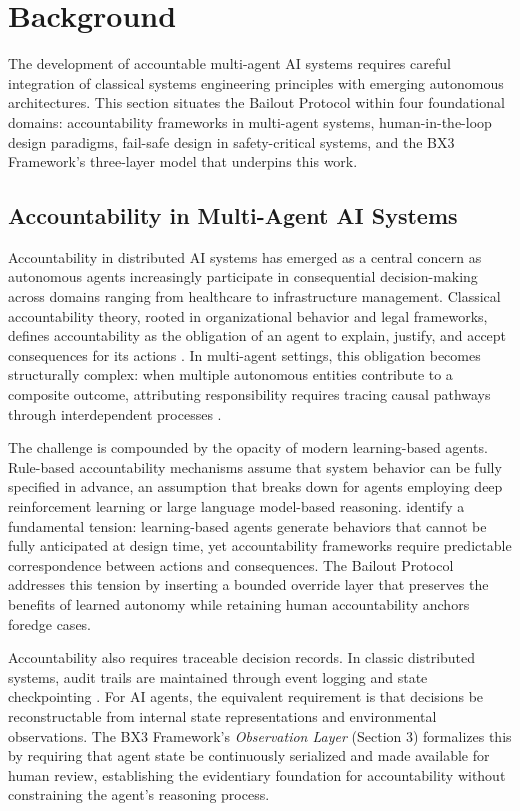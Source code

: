\section{Background}

The development of accountable multi-agent AI systems requires careful integration of classical systems engineering principles with emerging autonomous architectures. This section situates the Bailout Protocol within four foundational domains: accountability frameworks in multi-agent systems, human-in-the-loop design paradigms, fail-safe design in safety-critical systems, and the BX3 Framework's three-layer model that underpins this work.

\subsection{Accountability in Multi-Agent AI Systems}

Accountability in distributed AI systems has emerged as a central concern as autonomous agents increasingly participate in consequential decision-making across domains ranging from healthcare to infrastructure management. Classical accountability theory, rooted in organizational behavior and legal frameworks, defines accountability as the obligation of an agent to explain, justify, and accept consequences for its actions \cite{dijkstra1982}. In multi-agent settings, this obligation becomes structurally complex: when multiple autonomous entities contribute to a composite outcome, attributing responsibility requires tracing causal pathways through interdependent processes \cite{bansal2019}.

The challenge is compounded by the opacity of modern learning-based agents. Rule-based accountability mechanisms assume that system behavior can be fully specified in advance, an assumption that breaks down for agents employing deep reinforcement learning or large language model-based reasoning. \cite{bansal2019} identify a fundamental tension: learning-based agents generate behaviors that cannot be fully anticipated at design time, yet accountability frameworks require predictable correspondence between actions and consequences. The Bailout Protocol addresses this tension by inserting a bounded override layer that preserves the benefits of learned autonomy while retaining human accountability anchors foredge cases.

Accountability also requires traceable decision records. In classic distributed systems, audit trails are maintained through event logging and state checkpointing \cite{tristr81}. For AI agents, the equivalent requirement is that decisions be reconstructable from internal state representations and environmental observations. The BX3 Framework's \textit{Observation Layer} (Section 3) formalizes this by requiring that agent state be continuously serialized and made available for human review, establishing the evidentiary foundation for accountability without constraining the agent's reasoning process.

